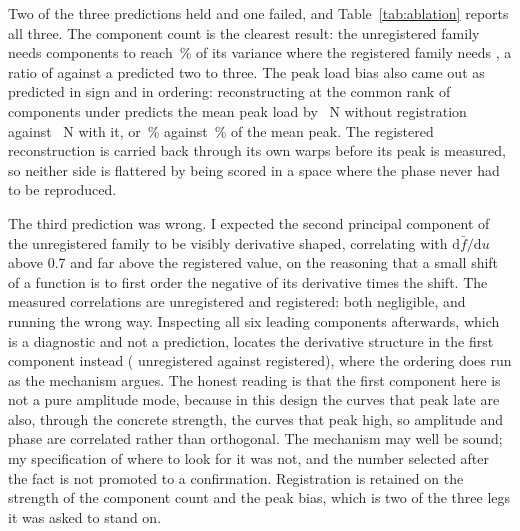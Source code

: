 \documentclass[11pt,a4paper]{article}
\begin{document}
Two of the three predictions held and one failed, and Table~\ref{tab:ablation} reports all three. The component count is the clearest result: the unregistered family needs \AblationComponentsUnregistered{} components to reach \VarianceTarget\,\% of its variance where the registered family needs \AblationComponentsRegistered{}, a ratio of \AblationComponentRatio{} against a predicted two to three. The peak load bias also came out as predicted in sign and in ordering: reconstructing at the common rank of \AblationRank{} components under predicts the mean peak load by \AblationPeakBiasUnregistered~N without registration against \AblationPeakBiasRegistered~N with it, or \AblationPeakBiasUnregisteredPct\,\% against \AblationPeakBiasRegisteredPct\,\% of the mean peak. The registered reconstruction is carried back through its own warps before its peak is measured, so neither side is flattered by being scored in a space where the phase never had to be reproduced.

The third prediction was wrong. I expected the second principal component of the unregistered family to be visibly derivative shaped, correlating with $\mathrm{d}\bar{f}/\mathrm{d}u$ above 0.7 and far above the registered value, on the reasoning that a small shift of a function is to first order the negative of its derivative times the shift. The measured correlations are \AblationDerivCorrUnregistered{} unregistered and \AblationDerivCorrRegistered{} registered: both negligible, and running the wrong way. Inspecting all six leading components afterwards, which is a diagnostic and not a prediction, locates the derivative structure in the first component instead (\AblationDerivCorrPCOneUnregistered{} unregistered against \AblationDerivCorrPCOneRegistered{} registered), where the ordering does run as the mechanism argues. The honest reading is that the first component here is not a pure amplitude mode, because in this design the curves that peak late are also, through the concrete strength, the curves that peak high, so amplitude and phase are correlated rather than orthogonal. The mechanism may well be sound; my specification of where to look for it was not, and the number selected after the fact is not promoted to a confirmation. Registration is retained on the strength of the component count and the peak bias, which is two of the three legs it was asked to stand on.

\begin{table}[tbp]
\centering
\caption{Ablation 1, registration against no registration, on the same \NValid{} curves. The predicted directions were committed before these numbers were computed; the second row is the one that refuted its prediction.}
\label{tab:ablation}

\end{table}
\end{document}
